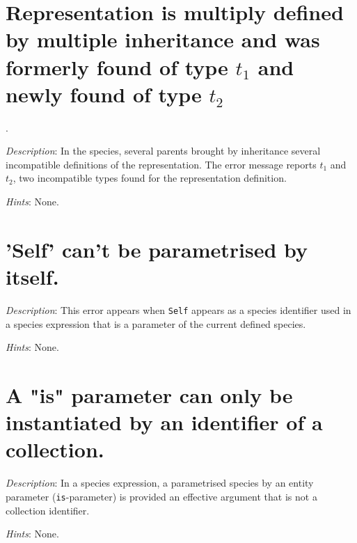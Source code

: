 \section*{Representation is multiply defined by multiple
  inheritance and was formerly found of type $t_1$ and newly found of
  type $t_2$}.

{\em Description}: In the species, several parents brought by
inheritance several incompatible definitions of the representation. The error message reports $t_1$ and $t_2$, two incompatible
types found for the representation definition.

{\em Hints}: None.



\section*{'Self' can't be parametrised by itself.}

{\em Description}: This error appears when {\tt Self} appears as a
species identifier used in a species expression that is a parameter of
the current defined species.



{\em Hints}: None.



\section*{A  "is"  parameter can only be  instantiated by an identifier of a collection.}

{\em Description}: In a species expression, a parametrised species by
an entity parameter ({\tt is}-parameter) is provided an effective
argument that is not a collection identifier.

{\em Hints}: None.

